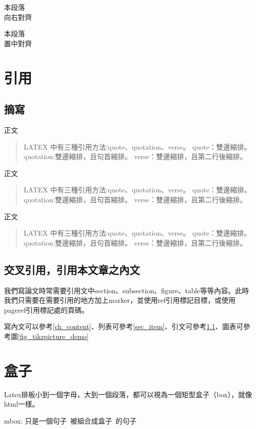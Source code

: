 \begin{flushright}
    本段落\\
    向右對齊
\end{flushright}

\begin{center}
    本段落\\
    置中對齊
\end{center}

\section{引用}
\subsection{摘寫}\label{ssec_qute}
正文
\begin{quote}
    LATEX 中有三種引用方法:quote、quotation、verse。
    quote：雙邊縮排。
    quotation:雙邊縮排，且句首縮排。
    verse：雙邊縮排，且第二行後縮排。
\end{quote}
正文
\begin{quotation}
    LATEX 中有三種引用方法:quote、quotation、verse。
    quote：雙邊縮排。
    quotation:雙邊縮排，且句首縮排。
    verse：雙邊縮排，且第二行後縮排。
\end{quotation}
正文
\begin{verse}
    LATEX 中有三種引用方法:quote、quotation、verse。
    quote：雙邊縮排。
    quotation:雙邊縮排，且句首縮排。
    verse：雙邊縮排，且第二行後縮排。
\end{verse}

\subsection{交叉引用，引用本文章之內文}
我們寫論文時常需要引用文中section、subsection、figure、table等等內容。此時我們只需要在需要引用的地方加上marker，並使用ref引用標記目標，或使用pageref引用標記處的頁碼。

寫內文可以參考\ref{ch_content}、列表可參考\ref{sec_item}、引文可參考\ref{ssec_qute}、圖表可參考圖\ref{fig_tikzpicture_demo}

\newpage
\section{盒子}
Latex排板小到一個字母，大到一個段落，都可以視為一個矩型盒子（box），就像html一樣。

mbox:
\mbox{只是一個句子 被組合成盒子 的句子}

